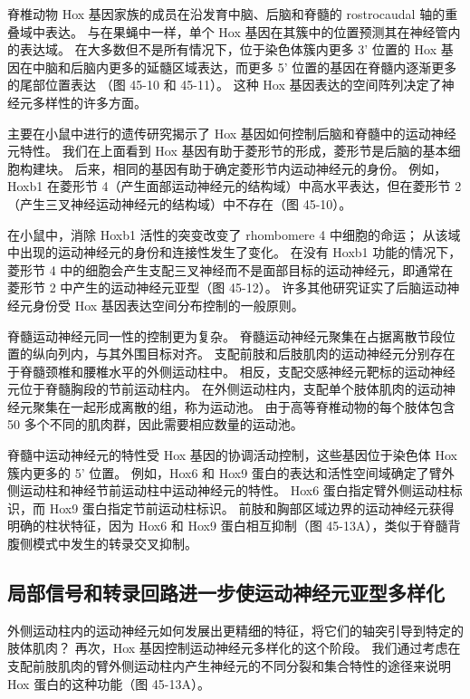脊椎动物 Hox 基因家族的成员在沿发育中脑、后脑和脊髓的 rostrocaudal 轴的重叠域中表达。 与在果蝇中一样，单个 Hox 基因在其簇中的位置预测其在神经管内的表达域。 在大多数但不是所有情况下，位于染色体簇内更多 3' 位置的 Hox 基因在中脑和后脑内更多的延髓区域表达，而更多 5' 位置的基因在脊髓内逐渐更多的尾部位置表达 （图 45-10 和 45-11）。 这种 Hox 基因表达的空间阵列决定了神经元多样性的许多方面。

主要在小鼠中进行的遗传研究揭示了 Hox 基因如何控制后脑和脊髓中的运动神经元特性。 我们在上面看到 Hox 基因有助于菱形节的形成，菱形节是后脑的基本细胞构建块。 后来，相同的基因有助于确定菱形节内运动神经元的身份。 例如，Hoxb1 在菱形节 4（产生面部运动神经元的结构域）中高水平表达，但在菱形节 2（产生三叉神经运动神经元的结构域）中不存在（图 45-10）。

在小鼠中，消除 Hoxb1 活性的突变改变了 rhombomere 4 中细胞的命运； 从该域中出现的运动神经元的身份和连接性发生了变化。 在没有 Hoxb1 功能的情况下，菱形节 4 中的细胞会产生支配三叉神经而不是面部目标的运动神经元，即通常在菱形节 2 中产生的运动神经元亚型（图 45-12）。 许多其他研究证实了后脑运动神经元身份受 Hox 基因表达空间分布控制的一般原则。

脊髓运动神经元同一性的控制更为复杂。 脊髓运动神经元聚集在占据离散节段位置的纵向列内，与其外围目标对齐。 支配前肢和后肢肌肉的运动神经元分别存在于脊髓颈椎和腰椎水平的外侧运动柱中。 相反，支配交感神经元靶标的运动神经元位于脊髓胸段的节前运动柱内。 在外侧运动柱内，支配单个肢体肌肉的运动神经元聚集在一起形成离散的组，称为运动池。 由于高等脊椎动物的每个肢体包含 50 多个不同的肌肉群，因此需要相应数量的运动池。

脊髓中运动神经元的特性受 Hox 基因的协调活动控制，这些基因位于染色体 Hox 簇内更多的 5' 位置。 例如，Hox6 和 Hox9 蛋白的表达和活性空间域确定了臂外侧运动柱和神经节前运动柱中运动神经元的特性。 Hox6 蛋白指定臂外侧运动柱标识，而 Hox9 蛋白指定节前运动柱标识。 前肢和胸部区域边界的运动神经元获得明确的柱状特征，因为 Hox6 和 Hox9 蛋白相互抑制（图 45-13A），类似于脊髓背腹侧模式中发生的转录交叉抑制。




\subsection{局部信号和转录回路进一步使运动神经元亚型多样化}
外侧运动柱内的运动神经元如何发展出更精细的特征，将它们的轴突引导到特定的肢体肌肉？ 再次，Hox 基因控制运动神经元多样化的这个阶段。 我们通过考虑在支配前肢肌肉的臂外侧运动柱内产生神经元的不同分裂和集合特性的途径来说明 Hox 蛋白的这种功能（图 45-13A）。

